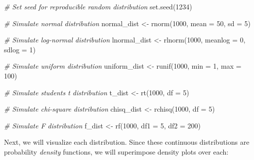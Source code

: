 \documentclass[
]{book}
\newenvironment{Shaded}{\begin{snugshade}}{\end{snugshade}}
\newcommand{\AttributeTok}[1]{\textcolor[rgb]{0.77,0.63,0.00}{#1}}
\newcommand{\CommentTok}[1]{\textcolor[rgb]{0.56,0.35,0.01}{\textit{#1}}}
\newcommand{\DecValTok}[1]{\textcolor[rgb]{0.00,0.00,0.81}{#1}}
\newcommand{\FunctionTok}[1]{\textcolor[rgb]{0.00,0.00,0.00}{#1}}
\newcommand{\NormalTok}[1]{#1}
\newcommand{\OtherTok}[1]{\textcolor[rgb]{0.56,0.35,0.01}{#1}}
\begin{document}
\begin{Shaded}
\begin{Highlighting}[]
\CommentTok{\# Set seed for reproducible random distribution}
\FunctionTok{set.seed}\NormalTok{(}\DecValTok{1234}\NormalTok{)}

\CommentTok{\# Simulate normal distribution}
\NormalTok{normal\_dist }\OtherTok{\textless{}{-}} \FunctionTok{rnorm}\NormalTok{(}\DecValTok{1000}\NormalTok{, }\AttributeTok{mean =} \DecValTok{50}\NormalTok{, }\AttributeTok{sd =} \DecValTok{5}\NormalTok{)}

\CommentTok{\# Simulate log{-}normal distribution}
\NormalTok{lnormal\_dist }\OtherTok{\textless{}{-}} \FunctionTok{rlnorm}\NormalTok{(}\DecValTok{1000}\NormalTok{, }\AttributeTok{meanlog =} \DecValTok{0}\NormalTok{, }\AttributeTok{sdlog =} \DecValTok{1}\NormalTok{)}

\CommentTok{\# Simulate uniform distribution}
\NormalTok{uniform\_dist }\OtherTok{\textless{}{-}} \FunctionTok{runif}\NormalTok{(}\DecValTok{1000}\NormalTok{, }\AttributeTok{min =} \DecValTok{1}\NormalTok{, }\AttributeTok{max =} \DecValTok{100}\NormalTok{) }

\CommentTok{\# Simulate student\textquotesingle{}s t distribution}
\NormalTok{t\_dist }\OtherTok{\textless{}{-}} \FunctionTok{rt}\NormalTok{(}\DecValTok{1000}\NormalTok{, }\AttributeTok{df =} \DecValTok{5}\NormalTok{)}

\CommentTok{\# Simulate chi{-}square distribution}
\NormalTok{chisq\_dist }\OtherTok{\textless{}{-}} \FunctionTok{rchisq}\NormalTok{(}\DecValTok{1000}\NormalTok{, }\AttributeTok{df =} \DecValTok{5}\NormalTok{)}

\CommentTok{\# Simulate F distribution}
\NormalTok{f\_dist }\OtherTok{\textless{}{-}} \FunctionTok{rf}\NormalTok{(}\DecValTok{1000}\NormalTok{, }\AttributeTok{df1 =} \DecValTok{5}\NormalTok{, }\AttributeTok{df2 =} \DecValTok{200}\NormalTok{)}
\end{Highlighting}
\end{Shaded}

Next, we will visualize each distribution. Since these continuous distributions are probability \emph{density} functions, we will superimpose density plots over each:
\end{document}
